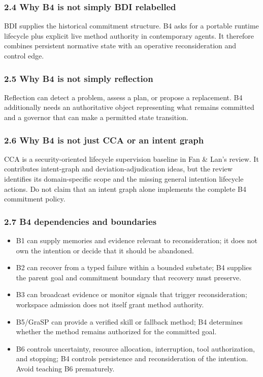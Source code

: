\subsubsection{2.4 Why B4 is not simply BDI relabelled}\label{why-b4-is-not-simply-bdi-relabelled}

BDI supplies the historical commitment structure. B4 asks for a portable runtime lifecycle plus explicit live method authority in contemporary agents. It therefore combines persistent normative state with an operative reconsideration and control edge.

\subsubsection{2.5 Why B4 is not simply reflection}\label{why-b4-is-not-simply-reflection}

Reflection can detect a problem, assess a plan, or propose a replacement. B4 additionally needs an authoritative object representing what remains committed and a governor that can make a permitted state transition.

\subsubsection{2.6 Why B4 is not just CCA or an intent graph}\label{why-b4-is-not-just-cca-or-an-intent-graph}

CCA is a security-oriented lifecycle supervision baseline in Fan \& Lan's review. It contributes intent-graph and deviation-adjudication ideas, but the review identifies its domain-specific scope and the missing general intention lifecycle actions. Do not claim that an intent graph alone implements the complete B4 commitment policy.

\subsubsection{2.7 B4 dependencies and boundaries}\label{b4-dependencies-and-boundaries}

\begin{itemize}
\tightlist
\item
  B1 can supply memories and evidence relevant to reconsideration; it does not own the intention or decide that it should be abandoned.
\item
  B2 can recover from a typed failure within a bounded substate; B4 supplies the parent goal and commitment boundary that recovery must preserve.
\item
  B3 can broadcast evidence or monitor signals that trigger reconsideration; workspace admission does not itself grant method authority.
\item
  B5/GraSP can provide a verified skill or fallback method; B4 determines whether the method remains authorized for the committed goal.
\item
  B6 controls uncertainty, resource allocation, interruption, tool authorization, and stopping; B4 controls persistence and reconsideration of the intention. Avoid teaching B6 prematurely.
\end{itemize}

